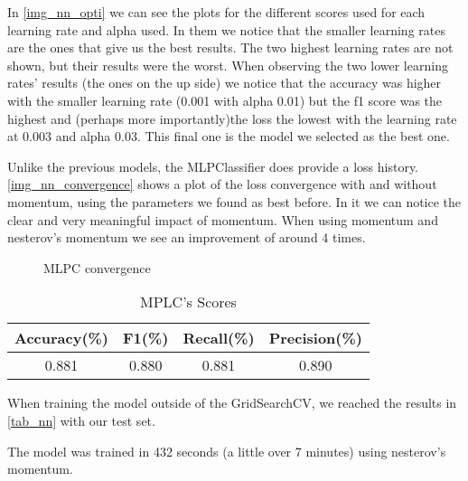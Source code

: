 \documentclass[12pt]{article}
\begin{document}
    \par 
        In \autoref{img_nn_opti} we can see the plots for the different scores used for each learning rate and alpha used. In them we notice that 
        the smaller learning rates are the ones that give us the best results. The two highest learning rates are not shown, but their results 
        were the worst. When observing the two lower learning rates' results (the ones on the up side) we notice that the accuracy was higher with 
        the smaller learning rate (0.001 with alpha 0.01) but the f1 score was the highest and (perhaps more importantly)the loss the lowest with the 
        learning rate at 0.003 and alpha 0.03. This final one is the model we selected as the best one.
    \par 
        Unlike the previous models, the MLPClassifier does provide a loss history. \autoref{img_nn_convergence} shows a plot of the loss convergence 
        with and without momentum, using the parameters we found as best before. In it we can notice the clear and very meaningful impact of momentum. When using 
        momentum and nesterov's momentum we see an improvement of around 4 times.
    \begin{figure}[!tb]
        \caption{MLPC convergence}
        \label{img_nn_convergence}
    \end{figure}
    \begin{center}
        \begin{table}[!h]
        \caption{MPLC's Scores}
        \begin{center}
        \begin{tabular}{|c |c |c |c|}
            \hline
            Accuracy(\%) & F1(\%) & Recall(\%) & Precision(\%) \\ [0.5ex] 
            \hline
            0.881 & 0.880 & 0.881 & 0.890 \\ 
            \hline
        \end{tabular}
        \label{tab_nn}
        \end{center}
    \end{table}
    \end{center}
    \par
        When training the model outside of the GridSearchCV, we reached the results in \autoref{tab_nn} with our test set.
    \par 
        The model was trained in 432 seconds (a little over 7 minutes) using nesterov's momentum.
\end{document}
